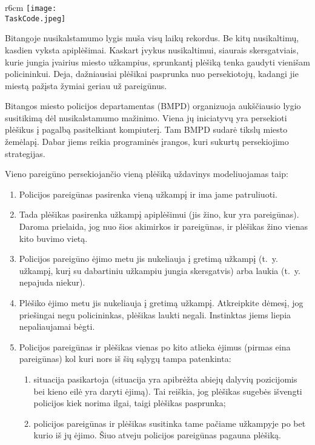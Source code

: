 \documentclass{boi2014-lt}
\renewcommand{\TaskCode}{coprobber}
\begin{document}
    \begin{wrapfigure}[8]{r}{6cm}
        \vspace{-24pt}
		\texttt{[image: \\TaskCode.jpeg]}
	\end{wrapfigure}

	Bitangoje nusikalstamumo lygis muša visų laikų rekordus. Be kitų
	nusikaltimų, kasdien vyksta apiplėšimai. Kaskart įvykus nusikaltimui,
	siaurais skersgatviais, kurie jungia įvairius miesto užkampius, sprunkantį
	plėšiką tenka gaudyti vienišam policininkui. Deja, dažniausiai plėšikai
	pasprunka nuo persekiotojų, kadangi jie miestą pažįsta žymiai geriau už
	pareigūnus.

	Bitangos miesto policijos departamentas (BMPD) organizuoja aukščiausio
	lygio susitikimą dėl nusikalstamumo mažinimo. Viena jų iniciatyvų yra
	persekioti plėšikus į pagalbą pasitelkiant kompiuterį. Tam BMPD sudarė
	tikslų miesto žemėlapį. Dabar jiems reikia programinės įrangos, kuri
	sukurtų persekiojimo strategijas.

	Vieno pareigūno persekiojančio vieną plėšiką uždavinys modeliuojamas taip:
	\begin{enumerate}
		\item Policijos pareigūnas pasirenka vieną užkampį ir ima jame
			patruliuoti.
		\item Tada plėšikas pasirenka užkampį apiplėšimui (jis žino, kur yra
			pareigūnas). Daroma prielaida, jog nuo šios akimirkos ir
			pareigūnas, ir plėšikas žino vienas kito buvimo vietą.
		\item Policijos pareigūno ėjimo metu jis nukeliauja į gretimą užkampį
			(t.~y. užkampį, kurį su dabartiniu užkampiu jungia skersgatvis)
			arba laukia (t.~y. nepajuda niekur).
		\item Plėšiko ėjimo metu jis nukeliauja į gretimą užkampį. Atkreipkite
			dėmesį, jog priešingai negu policininkas, plėšikas laukti negali.
			Instinktas jiems liepia nepaliaujamai bėgti.
		\item Policijos pareigūnas ir plėšikas vienas po kito atlieka ėjimus
			(pirmas eina pareigūnas) kol kuri nors iš šių sąlygų tampa patenkinta:
			\begin{enumerate}
				\item situacija pasikartoja (situacija yra apibrėžta abiejų
					dalyvių pozicijomis bei kieno eilė yra daryti ėjimą).
					Tai reiškia, jog plėšikas sugebės išvengti policijos
					kiek norima ilgai, taigi plėšikas pasprunka;
				\item policijos pareigūnas ir plėšikas susitinka tame pačiame
					užkampyje po bet kurio iš jų ėjimo. Šiuo atveju policijos
					pareigūnas pagauna plėšiką.
			\end{enumerate}
	\end{enumerate}
\end{document}
